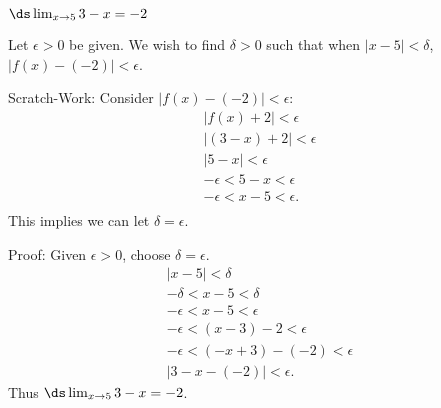 {$\ds\lim_{x\to 5} 3-x = -2$}
{Let $\epsilon >0$ be given. We wish to find $\delta >0$ such that when $|x-5|<\delta$, $|f(x)-(-2)|<\epsilon$. 

Scratch-Work:
Consider $|f(x)-(-2)|<\epsilon$:
\begin{gather*}
|f(x) + 2 | < \epsilon \\
|(3-x) + 2 |<\epsilon \\
| 5-x | < \epsilon \\
-\epsilon < 5-x < \epsilon \\
-\epsilon < x-5 < \epsilon. \\
\end{gather*}
This implies we can let $\delta =\epsilon$.

Proof: Given $\epsilon>0$, choose $\delta=\epsilon$.
\begin{gather*}
|x-5|<\delta \\
-\delta < x-5 < \delta\\
-\epsilon < x-5 < \epsilon\\
-\epsilon < (x-3)-2 < \epsilon \\
-\epsilon < (-x+3)-(-2) < \epsilon \\
|3-x - (-2)| < \epsilon.
\end{gather*}
Thus $\ds\lim_{x\to 5} 3-x = -2$.}

